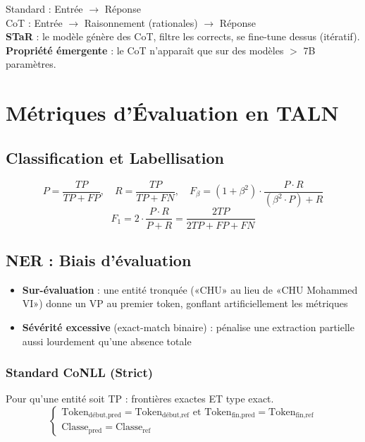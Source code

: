 \documentclass[a4paper,10pt]{article}
\begin{document}
\begin{definitionbox}
Standard : Entrée $\rightarrow$ Réponse\\
CoT : Entrée $\rightarrow$ Raisonnement (rationales) $\rightarrow$ Réponse\\
\textbf{STaR} : le modèle génère des CoT, filtre les corrects, se fine-tune dessus (itératif).\\
\textbf{Propriété émergente} : le CoT n'apparaît que sur des modèles $>$ 7B paramètres.
\end{definitionbox}

\section{Métriques d'Évaluation en TALN}

\subsection{Classification et Labellisation}

\begin{formulebox}\[
P = \frac{TP}{TP + FP}, \quad R = \frac{TP}{TP + FN}, \quad F_\beta = (1 + \beta^2) \cdot \frac{P \cdot R}{(\beta^2 \cdot P) + R}
\]
\[
F_1 = 2 \cdot \frac{P \cdot R}{P + R} = \frac{2TP}{2TP + FP + FN}
\]
\end{formulebox}

\subsection{NER : Biais d'évaluation}

\begin{warningbox}
\begin{itemize}
  \item \textbf{Sur-évaluation} : une entité tronquée («CHU» au lieu de «CHU Mohammed VI») donne un VP au premier token, gonflant artificiellement les métriques
  \item \textbf{Sévérité excessive} (exact-match binaire) : pénalise une extraction partielle aussi lourdement qu'une absence totale
\end{itemize}
\end{warningbox}

\subsubsection{Standard CoNLL (Strict)}
Pour qu'une entité soit TP : frontières exactes ET type exact.
\[
\begin{cases}
\text{Token}_{\text{début,pred}} = \text{Token}_{\text{début,ref}} \text{ et } \text{Token}_{\text{fin,pred}} = \text{Token}_{\text{fin,ref}}\\
\text{Classe}_{\text{pred}} = \text{Classe}_{\text{ref}}
\end{cases}
\]
\end{document}
